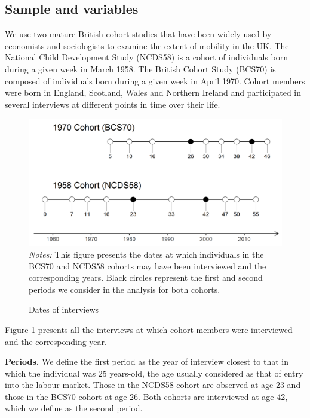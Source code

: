 \subsection{Sample and variables}

We use two mature British cohort studies that have been widely used by economists and sociologists to examine the extent of mobility in the UK. The National Child Development Study (NCDS58) is a cohort of individuals born during a given week in March 1958. The British Cohort Study (BCS70) is composed of individuals born during a given week in April 1970. Cohort members were born in England, Scotland, Wales and Northern Ireland and participated in several interviews at different points in time over their life. 
\begin{figure}[!tb]
    \centering
    \caption{Dates of interviews}
    \label{chap2-fig:interviews}
    \includegraphics[width=\linewidth]{chap2/graphic/itw-date-spreadpol.png}
	\vspace{-3em}
	\justify\singlespacing\footnotesize{\textit{Notes:} This figure presents the dates at which individuals in the BCS70 and NCDS58 cohorts may have been interviewed and the corresponding years. Black circles represent the first and second periods we consider in the analysis for both cohorts.}
\end{figure}
Figure \ref{chap2-fig:interviews} presents all the interviews at which cohort members were interviewed and the corresponding year.

\textbf{Periods.} We define the first period as the year of interview closest to that in which the individual was 25 years-old, the age usually considered as that of entry into the labour market. Those in the NCDS58 cohort are observed at age 23 and those in the BCS70 cohort at age 26. Both cohorts are interviewed at age 42, which we define as the second period.

